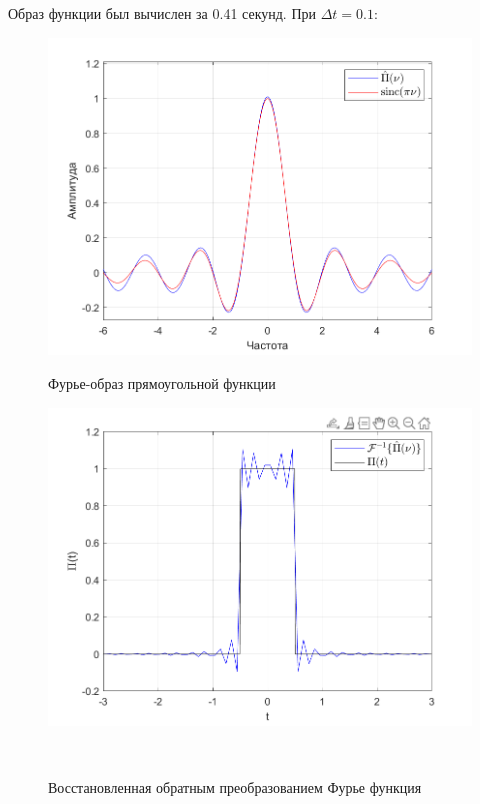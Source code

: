 \documentclass[a4paper]{article}
\begin{document}
Образ функции был вычислен за 0.41 секунд. При $\Delta t = 0.1$:

\begin{figure}[H]
    \begin{minipage}{0.5\textwidth}
        \centering \includegraphics[width=\textwidth]{graphs/1/T_10_dt_0.1_V_12_dv_0.001/fourier_numerical.png}
        \caption{Фурье-образ прямоугольной функции}
    \end{minipage}\hfill
    \begin{minipage}{0.5\textwidth}
        \centering \includegraphics[width=\textwidth]{graphs/1/T_10_dt_0.1_V_12_dv_0.001/func_inversed_fourier.png}
        \caption{Восстановленная обратным преобразованием Фурье функция}
    \end{minipage}\\[1em]
\end{figure}\noindent\
\end{document}
